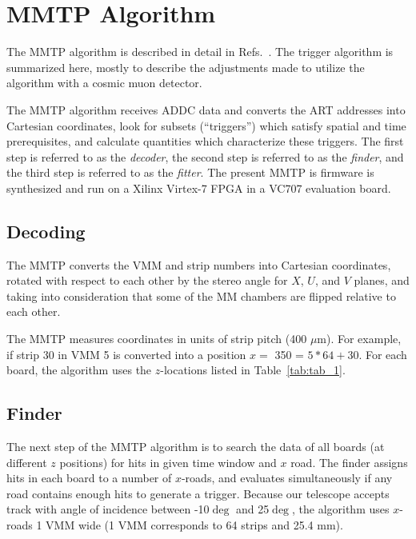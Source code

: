 \section{MMTP Algorithm}
\label{sec:alg}

The MMTP algorithm  is described in detail in Refs.~\cite{brian,steve}. The trigger algorithm is summarized here,
mostly to describe the adjustments made to utilize the algorithm with a cosmic muon detector.

The MMTP algorithm receives ADDC data and converts the ART addresses into Cartesian coordinates, look for subsets (``triggers'') which
 satisfy spatial and time prerequisites, and calculate quantities which characterize these triggers.
 The first step is referred to as the \textit{decoder}, the second step is referred to as the \textit{finder},
 and the third step is referred to as the \textit{fitter}.
 The present MMTP is firmware is synthesized and run on a Xilinx Virtex-7 FPGA in a VC707 evaluation board.
 

\subsection{Decoding}
\label{sec:alg-decode}

 The MMTP converts the VMM and strip numbers into Cartesian coordinates, rotated with respect to each other
  by the stereo angle
 for $X$, $U$, and $V$ planes, and 
 taking into consideration that some of the MM chambers are flipped relative to each other.
 
 The MMTP measures coordinates in units of strip pitch (400 $\mu$m).
 For example, if   strip 30 in VMM 5 is  converted into  a position 
 $x=$ 350 = $5*64 + 30$. 
 For each board, the algorithm uses the $z$-locations  listed in Table~\ref{tab:tab_1}.

\subsection{Finder}
\label{sec:alg-finder}
The next step of the MMTP algorithm is to search the data of all boards (at different $z$ positions)
for hits in given time window  and $x$ road.
The finder assigns hits in each board to a number of  $x$-roads, and evaluates
simultaneously if any road contains enough hits to generate a trigger.
Because our telescope accepts track with angle of incidence between -10$\deg$ and 25$\deg$, the algorithm uses
$x$-roads 1 VMM wide (1 VMM corresponds to 64 strips and 25.4 mm).

